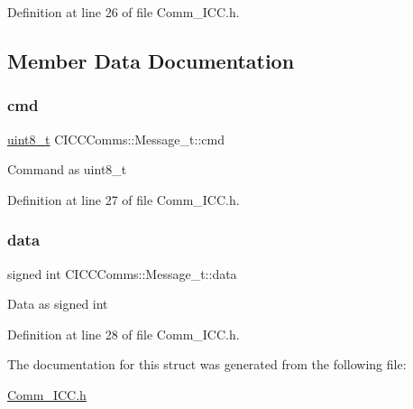 Definition at line 26 of file Comm\+\_\+\+I\+C\+C.\+h.



\subsection{Member Data Documentation}
\mbox{\label{struct_c_i_c_c_comms_1_1_message__t_adf3e3290f54ee3997bc837463a340d05}} 
\subsubsection{\texorpdfstring{cmd}{cmd}}
{\footnotesize\ttfamily \mbox{\hyperlink{_a_d_a_s___types_8h_aba7bc1797add20fe3efdf37ced1182c5}{uint8\+\_\+t}} C\+I\+C\+C\+Comms\+::\+Message\+\_\+t\+::cmd}

Command as uint8\+\_\+t 

Definition at line 27 of file Comm\+\_\+\+I\+C\+C.\+h.

\mbox{\label{struct_c_i_c_c_comms_1_1_message__t_a25cfce11e78d103524b695b281629d75}} 
\subsubsection{\texorpdfstring{data}{data}}
{\footnotesize\ttfamily signed int C\+I\+C\+C\+Comms\+::\+Message\+\_\+t\+::data}

Data as signed int 

Definition at line 28 of file Comm\+\_\+\+I\+C\+C.\+h.



The documentation for this struct was generated from the following file\+:\begin{DoxyCompactItemize}
\item 
\mbox{\hyperlink{_comm___i_c_c_8h}{Comm\+\_\+\+I\+C\+C.\+h}}\end{DoxyCompactItemize}
